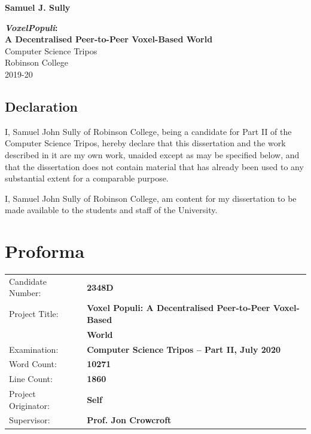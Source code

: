 \documentclass[12pt,notitlepage,a4paper]{report}
\newcommand{\voxpop}{\emph{VoxelPopuli}}
\begin{document}
	
	
	\pagestyle{empty}
	
	\hfill{\LARGE \bf Samuel J. Sully}
	
	\vspace*{60mm}
	\begin{center}
		\Huge
		{\bf \voxpop:\\ A Decentralised Peer-to-Peer Voxel-Based World} \\
		\vspace*{5mm}
		Computer Science Tripos \\
		\vspace*{5mm}
		Robinson College \\
		\vspace*{5mm}
		2019-20
	\end{center}
	
	\clearpage
	
	\setcounter{page}{1}
	\pagestyle{plain}
	
	\newpage
	\section*{Declaration}
	
	I, Samuel John Sully of Robinson College, being a candidate for Part II of the Computer
	Science Tripos, hereby declare that this dissertation and the work described in it are
	my own work, unaided except as may be specified below, and that the dissertation does
	not contain material that has already been used to any substantial extent for a comparable
	purpose.
	
	\bigskip
	
	\noindent I, Samuel John Sully of Robinson College, am content for my dissertation to be made available to the students and staff of the University.
	
	\clearpage
	
	\chapter*{Proforma}
	{
		\begin{tabular}{ll}
			Candidate Number:   & \bf 2348D\\
			Project Title:      & \bf Voxel Populi: A Decentralised Peer-to-Peer Voxel-Based\\ 
			& \bf World\\
			Examination:        & \bf Computer Science Tripos -- Part II, July 2020\\
			Word Count:         & \bf 10271\footnotemark[1]\\
			Line Count:         & \bf 1860\footnotemark[2]\\
			Project Originator: & \bf Self\\
			Supervisor:         & \bf Prof. Jon Crowcroft\\
		\end{tabular}
	}
	
\end{document}
